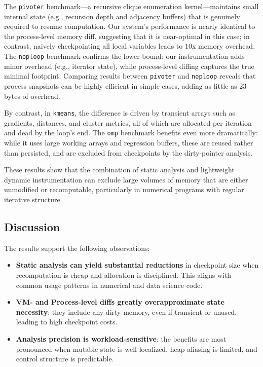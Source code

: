 The \texttt{pivoter} benchmark---a recursive clique enumeration kernel---maintains small internal state (e.g., recursion depth and adjacency buffers) that is genuinely required to resume computation. Our system’s performance is nearly identical to the process-level memory diff, suggesting that it is near-optimal in this case; in contrast, naively checkpointing all local variables leads to 10x memory overhead. The \texttt{noploop} benchmark confirms the lower bound: our instrumentation adds minor overhead (e.g., iterator state), while process-level diffing captures the true minimal footprint. Comparing \texttt{\PROCDIFF} results between \texttt{pivoter} and \texttt{noploop} reveals that process snapshots can be highly efficient in simple cases, adding as little as 23 bytes of overhead.

By contrast, in \texttt{kmeans}, the difference is driven by transient arrays such as gradients, distances, and cluster metrics, all of which are allocated per iteration and dead by the loop's end. The \texttt{omp} benchmark benefits even more dramatically: while it uses large working arrays and regression buffers, these are reused rather than persisted, and are excluded from checkpoints by the dirty-pointer analysis.

These results show that the combination of static analysis and lightweight dynamic instrumentation can exclude large volumes of memory that are either unmodified or recomputable, particularly in numerical programs with regular iterative structure.

\subsection{Discussion}

The results support the following observations:

\begin{itemize}
  \item \textbf{Static analysis can yield substantial reductions} in checkpoint size when recomputation is cheap and allocation is disciplined. This aligns with common usage patterns in numerical and data science code.
  \item \textbf{VM- and Process-level diffs greatly overapproximate state necessity}: they include any dirty memory, even if transient or unused, leading to high checkpoint costs.
  \item \textbf{Analysis precision is workload-sensitive}: the benefits are most pronounced when mutable state is well-localized, heap aliasing is limited, and control structure is predictable.
\end{itemize}

